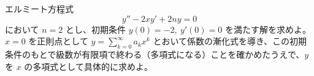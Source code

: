 
エルミート方程式
\[
y'' - 2xy' + 2ny = 0
\]
において $n=2$ とし、初期条件 $y(0) = -2,\ y'(0) = 0$ を満たす解を求めよ。$x=0$ を正則点として $y = \displaystyle\sum_{k=0}^{\infty} a_k x^{k}$ とおいて係数の漸化式を導き、この初期条件のもとで級数が有限項で終わる（多項式になる）ことを確かめたうえで、$y$ を $x$ の多項式として具体的に求めよ。

